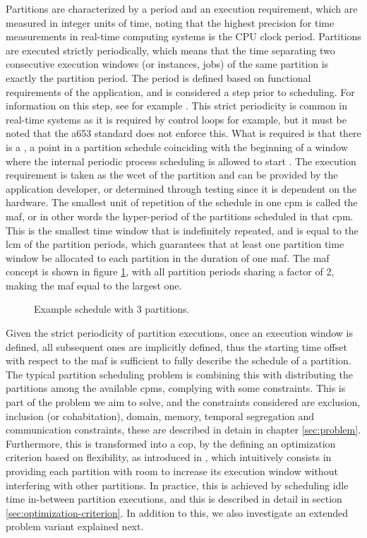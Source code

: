 \documentclass[main.tex]{subfiles}
\begin{document}
Partitions are characterized by a period and an execution requirement, which are measured in integer units of time, noting that the highest precision for time measurements in real-time computing systems is the CPU clock period.
Partitions are executed strictly periodically, which means that the time separating two consecutive execution windows (or instances, jobs) of the same partition is exactly the partition period.
The period is defined based on functional requirements of the application, and is considered a step prior to scheduling.
For information on this step, see for example \textcite{nasri2015efficient}.
This strict periodicity is common in real-time systems as it is required by control loops for example, but it must be noted that the \gls{a653} standard does not enforce this. 
What is required is that there is a , a point in a partition schedule coinciding with the beginning of a window where the internal periodic process scheduling is allowed to start \cite{arinc653}.
The execution requirement is taken as the \gls{wcet} of the partition and can be provided by the application developer, or determined through testing since it is dependent on the hardware.
The smallest unit of repetition of the schedule in one \gls{cpm} is called the \gls{maf}, or in other words the hyper-period of the partitions scheduled in that \gls{cpm}.
This is the smallest time window that is indefinitely repeated, and is equal to the \gls{lcm} of the partition periods, which guarantees that at least one partition time window be allocated to each partition in the duration of one \gls{maf}. 
The \gls{maf} concept is shown in figure \ref{fig:maf-scheme},  with all partition periods sharing a factor of \num{2}, making the \gls{maf} equal to the largest one.

\begin{figure}[htbp]
	\centering
	\resizebox{0.95\linewidth}{!}{}
	\caption{Example schedule with 3 partitions.}
	\label{fig:maf-scheme}
\end{figure}

Given the strict periodicity of partition executions, once an execution window is defined, all subsequent ones are implicitly defined, thus the starting time offset with respect to the \gls{maf} is sufficient to fully describe the schedule of a partition.
The typical partition scheduling problem is combining this with distributing the partitions among the available \glspl{cpm}, complying with some constraints.
This is part of the problem we aim to solve, and the constraints considered are exclusion, inclusion (or cohabitation), domain, memory, temporal segregation and communication constraints, these are described in detain in chapter \ref{sec:problem}.
Furthermore, this is transformed into a \gls{cop}, by the defining an optimization criterion based on flexibility, as introduced in \cite{al2010partition}, which intuitively consists in providing each partition with room to increase its execution window without interfering with other partitions.
In practice, this is achieved by scheduling idle time in-between partition executions, and this is described in detail in section \ref{sec:optimization-criterion}.
In addition to this, we also investigate an extended problem variant explained next.
\end{document}
